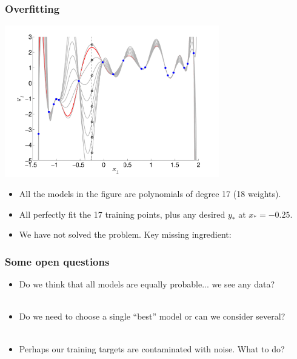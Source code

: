 \begin{frame}
\frametitle{Overfitting}

\centerline{\includegraphics[width=0.7\textwidth]{toy_data_polynomial_choose_your_target.pdf}}

\begin{itemize}
\item All the models in the figure are polynomials of degree 17 (18 weights).
\item All perfectly fit the 17 training points, plus any desired $y_*$ at $x_*=-0.25$.
\item We have not solved the problem. Key missing ingredient: 
\end{itemize}
\end{frame}

\begin{frame}
\frametitle{Some open questions}

\begin{itemize}
\item Do we think that all models are equally probable...  we see any data?\\[1ex]
\hfill {}\\[4ex]
\item Do we need to choose a single ``best'' model or can we consider several?\\[1ex] 
\hfill {}\\[4ex]
\item Perhaps our training targets are contaminated with noise. What to do?\\[1ex]
\hfill {}
\end{itemize}
\end{frame}


